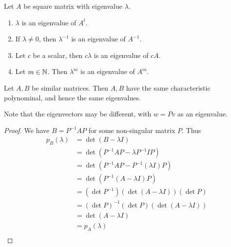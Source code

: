 \documentclass{article}
\begin{document}
\begin{theorem}
  Let $A$ be square matrix with eigenvalue $\lambda$.
  \begin{enumerate}
    \item $\lambda$ is an eigenvalue of $A^t$.
    \item If $\lambda \neq 0$, then $\lambda^{-1}$ is an eigenvalue of $A^{-1}$.
    \item Let $c$ be a scalar, then $c\lambda$ is an eigenvalue of $cA$.
    \item Let $m \in \mathbb{N}$. Then $\lambda^m$ is an eigenvalue of $A^m$.
  \end{enumerate}
\end{theorem}
\begin{theorem}
  Let $A, B$ be similar matrices. Then $A, B$ have the same characteristic polynominal, and hence the same eigenvalues.

  Note that the eigenvectors may be different, with $w = Pv$ as an eigenvalue.
\end{theorem}
\begin{proof}
  We have $B = P^{-1}AP$ for some non-singular matrix $P$. Thus
  \begin{align*}
    p_B(\lambda) & = \det (B - \lambda I)                        \\
                 & = \det (P^{-1}AP - \lambda P^{-1}IP)          \\
                 & = \det (P^{-1}AP - P^{-1}(\lambda I)P)        \\
                 & = \det (P^{-1} (A - \lambda I)P)              \\
                 & = (\det P^{-1})(\det (A - \lambda I))(\det P) \\
                 & = (\det P)^{-1}(\det P)(\det (A - \lambda I)) \\
                 & = \det (A - \lambda I)                        \\
                 & = p_A(\lambda)                                \\
  \end{align*}
\end{proof}
\end{document}
